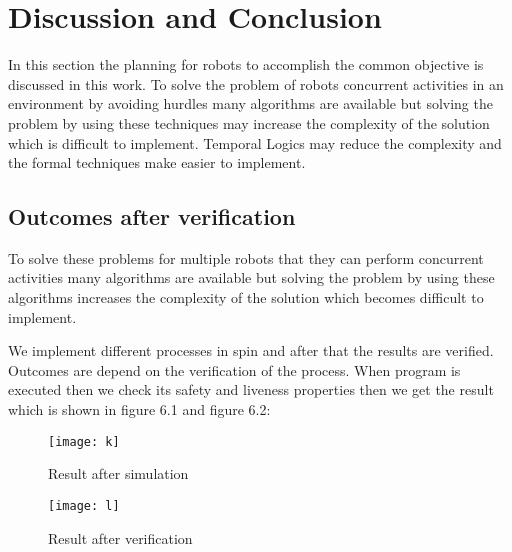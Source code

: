 
\chapter{Discussion and Conclusion} %

\label{Chapter6} %



In this section the planning for robots to accomplish the common objective is discussed in this work. To solve the problem of robots concurrent activities in an environment by avoiding hurdles many algorithms are available but solving the problem by using these techniques may increase the complexity of the solution which is difficult to implement. Temporal Logics may reduce the complexity and the formal techniques make easier to implement.
\section{Outcomes after verification}
To solve these problems for multiple robots that they can perform concurrent activities many algorithms are available but solving the problem by using these algorithms increases the complexity of the solution which becomes difficult to implement.

We implement different processes in spin and after that the results are verified. Outcomes are depend on the verification of the process. When program is executed then we check its safety and liveness properties then we get the result which is shown in figure 6.1 and figure 6.2:

\begin{landscape}
\begin{figure}[h]
\centering
  \texttt{[image: k]}\\
  \caption{Result after simulation}
\end{figure}
\end{landscape}

\begin{landscape}
\begin{figure}[h]
\centering
  \texttt{[image: l]}\\
  \caption{Result after verification}
\end{figure}
\end{landscape}


